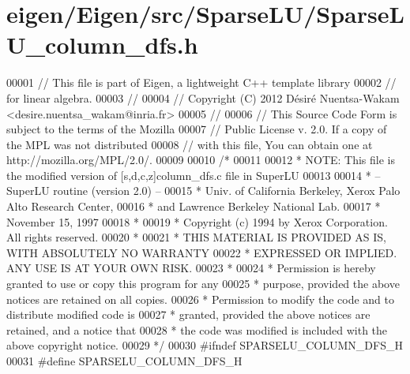 \hypertarget{eigen_2_eigen_2src_2_sparse_l_u_2_sparse_l_u__column__dfs_8h_source}{}\section{eigen/\+Eigen/src/\+Sparse\+L\+U/\+Sparse\+L\+U\+\_\+column\+\_\+dfs.h}
\label{eigen_2_eigen_2src_2_sparse_l_u_2_sparse_l_u__column__dfs_8h_source}

\begin{DoxyCode}
00001 \textcolor{comment}{// This file is part of Eigen, a lightweight C++ template library}
00002 \textcolor{comment}{// for linear algebra.}
00003 \textcolor{comment}{//}
00004 \textcolor{comment}{// Copyright (C) 2012 Désiré Nuentsa-Wakam <desire.nuentsa\_wakam@inria.fr>}
00005 \textcolor{comment}{//}
00006 \textcolor{comment}{// This Source Code Form is subject to the terms of the Mozilla}
00007 \textcolor{comment}{// Public License v. 2.0. If a copy of the MPL was not distributed}
00008 \textcolor{comment}{// with this file, You can obtain one at http://mozilla.org/MPL/2.0/.}
00009 
00010 \textcolor{comment}{/* }
00011 \textcolor{comment}{ }
00012 \textcolor{comment}{ * NOTE: This file is the modified version of [s,d,c,z]column\_dfs.c file in SuperLU }
00013 \textcolor{comment}{ }
00014 \textcolor{comment}{ * -- SuperLU routine (version 2.0) --}
00015 \textcolor{comment}{ * Univ. of California Berkeley, Xerox Palo Alto Research Center,}
00016 \textcolor{comment}{ * and Lawrence Berkeley National Lab.}
00017 \textcolor{comment}{ * November 15, 1997}
00018 \textcolor{comment}{ *}
00019 \textcolor{comment}{ * Copyright (c) 1994 by Xerox Corporation.  All rights reserved.}
00020 \textcolor{comment}{ *}
00021 \textcolor{comment}{ * THIS MATERIAL IS PROVIDED AS IS, WITH ABSOLUTELY NO WARRANTY}
00022 \textcolor{comment}{ * EXPRESSED OR IMPLIED.  ANY USE IS AT YOUR OWN RISK.}
00023 \textcolor{comment}{ *}
00024 \textcolor{comment}{ * Permission is hereby granted to use or copy this program for any}
00025 \textcolor{comment}{ * purpose, provided the above notices are retained on all copies.}
00026 \textcolor{comment}{ * Permission to modify the code and to distribute modified code is}
00027 \textcolor{comment}{ * granted, provided the above notices are retained, and a notice that}
00028 \textcolor{comment}{ * the code was modified is included with the above copyright notice.}
00029 \textcolor{comment}{ */}
00030 \textcolor{preprocessor}{#ifndef SPARSELU\_COLUMN\_DFS\_H}
00031 \textcolor{preprocessor}{#define SPARSELU\_COLUMN\_DFS\_H}

\end{DoxyCode}
